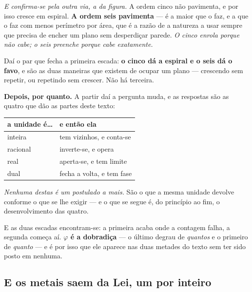 \documentclass[livro.tex]{subfiles}
\begin{document}
\medskip
\noindent \emph{E confirma-se pela outra via, a da figura.} A ordem cinco não pavimenta, e por isso
cresce em espiral. \textbf{A ordem seis pavimenta} --- é a maior que o faz, e a que o faz com menos
perímetro por área, que é a razão de a natureza a usar sempre que precisa de encher um plano sem
desperdiçar parede. \emph{O cinco enrola porque não cabe; o seis preenche porque cabe exatamente.}

\medskip
\noindent Daí o par que fecha a primeira escada: \textbf{o cinco dá a espiral e o seis dá o favo},
e são as duas maneiras que existem de ocupar um plano --- crescendo sem repetir, ou repetindo sem
crescer. Não há terceira.

\medskip
\medskip
\noindent \textbf{Depois, por quanto.} A partir daí a pergunta muda, e as respostas são as quatro
que dão as partes deste texto:

\begin{center}\small
\begin{tabular}{@{}ll@{}}
\toprule
\textbf{a unidade é\dots} & \textbf{e então ela} \\
\midrule
inteira  & tem vizinhos, e conta-se \\
racional & inverte-se, e opera \\
real     & aperta-se, e tem limite \\
dual     & fecha a volta, e tem fase \\
\bottomrule
\end{tabular}
\end{center}

\noindent \emph{Nenhuma destas é um postulado a mais.} São o que a mesma unidade devolve conforme o
que se lhe exigir --- e o que se segue é, do princípio ao fim, o desenvolvimento das quatro.

\medskip
\noindent E as duas escadas encontram-se: a primeira acaba onde a contagem falha, a segunda começa
aí. \textbf{$\varphi$ é a dobradiça} --- o último degrau de \emph{quantos} e o primeiro de
\emph{quanto} --- e é por isso que ele aparece nas duas metades do texto sem ter sido posto em
nenhuma.

\subsection{E os metais saem da Lei, um por inteiro}\label{sec:metaisdalei}
\end{document}
